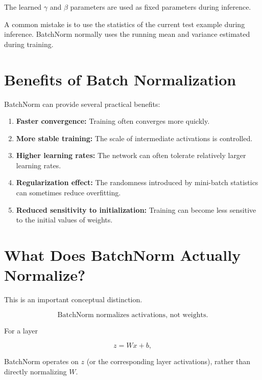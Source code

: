 \documentclass[11pt,a4paper]{article}
\begin{document}
	The learned $\gamma$ and $\beta$ parameters are used as fixed parameters
	during inference.
	
	\begin{important}
		A common mistake is to use the statistics of the current test example
		during inference. BatchNorm normally uses the running mean and variance
		estimated during training.
	\end{important}
	
	\section{Benefits of Batch Normalization}
	
	BatchNorm can provide several practical benefits:
	
	\begin{enumerate}[leftmargin=1.8em]
		\item \textbf{Faster convergence:}
		Training often converges more quickly.
		
		\item \textbf{More stable training:}
		The scale of intermediate activations is controlled.
		
		\item \textbf{Higher learning rates:}
		The network can often tolerate relatively larger learning rates.
		
		\item \textbf{Regularization effect:}
		The randomness introduced by mini-batch statistics can sometimes
		reduce overfitting.
		
		\item \textbf{Reduced sensitivity to initialization:}
		Training can become less sensitive to the initial values of weights.
	\end{enumerate}
	
	\section{What Does BatchNorm Actually Normalize?}
	
	This is an important conceptual distinction.
	
	\begin{summarybox}
		\[
		\boxed{\text{BatchNorm normalizes activations, not weights.}}
		\]
		
		For a layer
		
		\[
		z=Wx+b,
		\]
		
		BatchNorm operates on $z$ (or the corresponding layer activations),
		rather than directly normalizing $W$.
	\end{summarybox}
	
\end{document}
